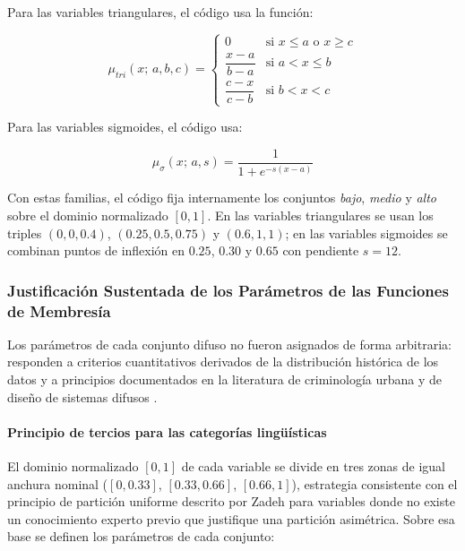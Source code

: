 \documentclass[11pt]{article}
\begin{document}
Para las variables triangulares, el código usa la función:

\begin{equation}
    \mu_{tri}(x;\, a, b, c) =
    \begin{cases}
        0                    & \text{si } x \leq a \text{ o } x \geq c \\
        \dfrac{x - a}{b - a} & \text{si } a < x \leq b \\
        \dfrac{c - x}{c - b} & \text{si } b < x < c
    \end{cases}
    \label{eq:trimf}
\end{equation}

Para las variables sigmoides, el código usa:

\begin{equation}
    \mu_{\sigma}(x;\, a, s) = \frac{1}{1 + e^{-s(x-a)}}
\end{equation}

Con estas familias, el código fija internamente los conjuntos \textit{bajo}, \textit{medio} y \textit{alto} sobre el dominio normalizado $[0,1]$. En las variables triangulares se usan los triples $(0, 0, 0.4)$, $(0.25, 0.5, 0.75)$ y $(0.6, 1, 1)$; en las variables sigmoides se combinan puntos de inflexión en $0.25$, $0.30$ y $0.65$ con pendiente $s = 12$.

\subsubsection{Justificación Sustentada de los Parámetros de las Funciones de Membresía}

Los parámetros de cada conjunto difuso no fueron asignados de forma arbitraria: responden a criterios cuantitativos derivados de la distribución histórica de los datos y a principios documentados en la literatura de criminología urbana y de diseño de sistemas difusos \cite{b1,b7}.

\paragraph{Principio de tercios para las categorías lingüísticas}

El dominio normalizado $[0,1]$ de cada variable se divide en tres zonas de igual anchura nominal ($[0, 0.33]$, $[0.33, 0.66]$, $[0.66, 1]$), estrategia consistente con el principio de partición uniforme descrito por Zadeh \cite{b1} para variables donde no existe un conocimiento experto previo que justifique una partición asimétrica. Sobre esa base se definen los parámetros de cada conjunto:
\end{document}
